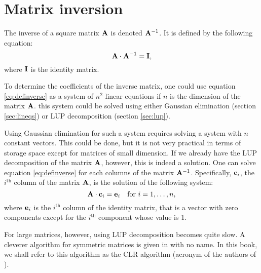 \documentclass[twoside]{book}
\begin{document}
\section{Matrix inversion}
\label{sec:matrixinversion} The inverse of a square matrix ${\bf
A}$ is denoted ${\bf A}^{-1}$. It is defined by the following
equation:
\begin{equation}
\label{eq:definverse} {\bf A}\cdot{\bf A}^{-1}={\bf I},
\end{equation}
where ${\bf I}$ is the identity matrix.

To determine the coefficients of the inverse matrix, one could use
equation \ref{eq:definverse} as a system of $n^2$ linear equations
if $n$ is the dimension of the matrix ${\bf A}$. this system could
be solved using either Gaussian elimination (\cf section
\ref{sec:lineqs}) or LUP decomposition (\cf section
\ref{sec:lup}).

Using Gaussian elimination for such a system requires solving a
system with $n$ constant vectors. This could be done, but it is
not very practical in terms of storage space except for matrices
of small dimension. If we already have the LUP decomposition of
the matrix ${\bf A}$, however, this is indeed a solution. One can
solve equation \ref{eq:definverse} for each columns of the matrix
${\bf A}^{-1}$. Specifically, ${\bf c}_i$, the $i^{\mathop{th}}$
column of the matrix ${\bf A}$, is the solution of the following
system:
\begin{equation}
  {\bf A}\cdot{\bf c}_i={\bf e}_i\mbox{\quad for $i=1,\ldots,n$},
\end{equation}
where ${\bf e}_i$ is the $i^{\mathop{th}}$ column of the identity
matrix, that is a vector with zero components except for the
$i^{\mathop{th}}$ component whose value is 1.

For large matrices, however, using LUP decomposition becomes quite
slow. A cleverer algorithm for symmetric matrices is given in
\cite{CorLeiRiv} with no name. In this book, we shall refer to
this algorithm as the CLR algorithm (acronym of the authors of
\cite{CorLeiRiv}).
\end{document}
